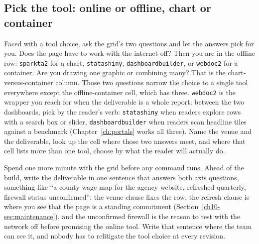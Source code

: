 \subsection{Pick the tool: online or offline, chart or container}\label{sec:suite-choose}
Faced with a tool choice, ask the grid's two questions and let the answers pick for you. Does the page have to work with the internet off? Then you are in the offline row: \texttt{sparkta2} for a chart, \texttt{statashiny}, \texttt{dashboardbuilder}, or \texttt{webdoc2} for a container. Are you drawing one graphic or combining many? That is the chart-versus-container column. Those two questions narrow the choice to a single tool everywhere except the offline-container cell, which has three. \texttt{webdoc2} is the wrapper you reach for when the deliverable is a whole report; between the two dashboards, pick by the reader's verb: \texttt{statashiny} when readers explore rows with a search box or slider, \texttt{dashboardbuilder} when readers scan headline tiles against a benchmark (Chapter~\ref{ch:portals} works all three). Name the venue and the deliverable, look up the cell where those two answers meet, and where that cell lists more than one tool, choose by what the reader will actually do.

Spend one more minute with the grid before any command runs. Ahead of the build, write the deliverable in one sentence that answers both axis questions, something like \enquote{a county wage map for the agency website, refreshed quarterly, firewall status unconfirmed}: the venue clause fixes the row, the refresh clause is where you see that the page is a standing commitment (Section~\ref{ch10-sec:maintenance}), and the unconfirmed firewall is the reason to test with the network off before promising the online tool. Write that sentence where the team can see it, and nobody has to relitigate the tool choice at every revision.

